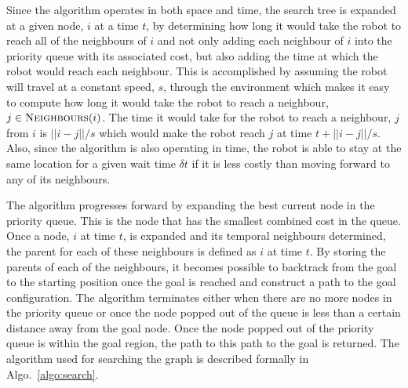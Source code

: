 Since the algorithm operates in both space and time, the search tree is
expanded at a given node, $i$ at a time $t$, by determining how long it would
take the robot to reach all of the neighbours of $i$ and not only adding each
neighbour of $i$ into the priority queue with its associated cost, but also
adding the time at which the robot would reach each neighbour. This is
accomplished by assuming the robot will travel at a constant speed, $s$,
through the environment which makes it easy to compute how long it would take
the robot to reach a neighbour, $j \in \Function{Neighbours}(i)$. The time it
would take for the robot to reach a neighbour, $j$ from $i$ is $||i - j|| / s$
which would make the robot reach $j$ at time $t + ||i - j|| / s$.  Also, since
the algorithm is also operating in time, the robot is able to stay at the same
location for a given wait time $\delta t$ if it is less costly than moving
forward to any of its neighbours.

The algorithm progresses forward by expanding the best current node in the
priority queue. This is the node that has the smallest combined cost in the
queue.  Once a node, $i$ at time $t$, is expanded and its temporal neighbours
determined, the parent for each of these neighbours is defined as $i$ at time
$t$. By storing the parents of each of the neighbours, it becomes possible to
backtrack from the goal to the starting position once the goal is reached and
construct a path to the goal configuration. The algorithm terminates either
when there are no more nodes in the priority queue or once the node popped out
of the queue is less than a certain distance away from the goal node. Once the
node popped out of the priority queue is within the goal region, the path to
this path to the goal is returned. The algorithm used for searching the graph
is described formally in Algo.~\ref{algo:search}.

